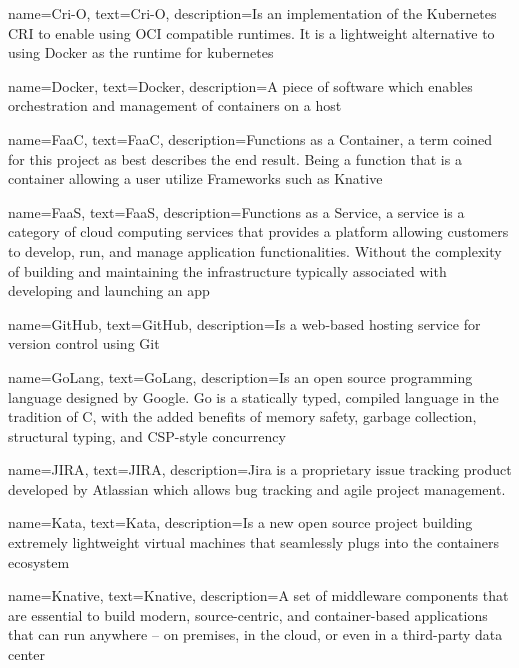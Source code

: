 {
    name={Cri-O},
    text={Cri-O},
    description={Is an implementation of the Kubernetes \gls{CRI} to enable using \gls{OCI} compatible runtimes. It is a lightweight alternative to using Docker as the runtime for kubernetes}
}

{
    name={Docker},
    text={Docker},
    description={A piece of software which enables orchestration and management of containers on a host}
}

{
    name={FaaC},
    text={FaaC},
    description={Functions as a Container, a term coined for this project as best describes the end result. Being a function that is a container allowing a user utilize Frameworks such as \gls{Knative}}
}

{
    name={FaaS},
    text={FaaS},
    description={Functions as a Service, a service is a category of cloud computing services that provides a platform allowing customers to develop, run, and manage application functionalities. Without the complexity of building and maintaining the infrastructure typically associated with developing and launching an app}
}

{
    name={GitHub},
    text={GitHub},
    description={Is a web-based hosting service for version control using Git}
}

{
    name={GoLang},
    text={GoLang},
    description={Is an open source programming language designed by Google. Go is a statically typed, compiled language in the tradition of C, with the added benefits of memory safety, garbage collection, structural typing, and CSP-style concurrency}
}

{
    name={JIRA},
    text={JIRA},
    description={Jira is a proprietary issue tracking product developed by Atlassian which allows bug tracking and agile project management.}
}

{
    name={Kata},
    text={Kata},
    description={Is a new open source project building extremely lightweight virtual machines that seamlessly plugs into the containers ecosystem}
}

{
    name={Knative},
    text={Knative},
    description={A set of middleware components that are essential to build modern, source-centric, and container-based applications that can run anywhere -- on premises, in the cloud, or even in a third-party data center}
}

